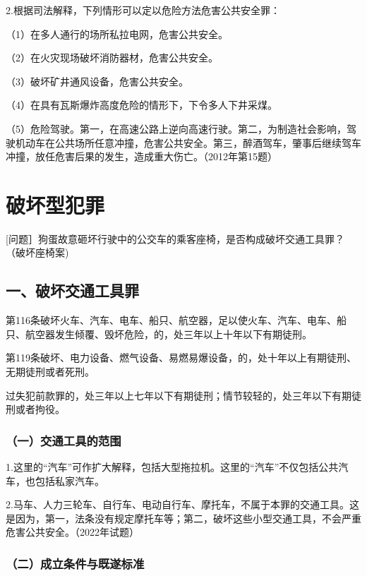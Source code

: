 2.根据司法解释，下列情形可以定以危险方法危害公共安全罪：

（1）在多人通行的场所私拉电网，危害公共安全。

（2）在火灾现场破坏消防器材，危害公共安全。

（3）破坏矿井通风设备，危害公共安全。

（4）在具有瓦斯爆炸高度危险的情形下，下令多人下井采煤。

（5）危险驾驶。第一，在高速公路上逆向高速行驶。第二，为制造社会影响，驾驶机动车在公共场所任意冲撞，危害公共安全。第三，醉酒驾车，肇事后继续驾车冲撞，放任危害后果的发生，造成重大伤亡。（2012年第15题）

\section{破坏型犯罪}

[问题］狗蛋故意砸坏行驶中的公交车的乘客座椅，是否构成破坏交通工具罪？（破坏座椅案)

\subsection*{一、破坏交通工具罪}

第116条破坏火车、汽车、电车、船只、航空器，足以使火车、汽车、电车、船只、航空器发生倾覆、毁坏危险，的，处三年以上十年以下有期徒刑。

第119条破坏、电力设备、燃气设备、易燃易爆设备，的，处十年以上有期徒刑、无期徒刑或者死刑。

过失犯前款罪的，处三年以上七年以下有期徒刑；情节较轻的，处三年以下有期徒刑或者拘役。

\subsubsection*{（一）交通工具的范围}

1.这里的“汽车”可作扩大解释，包括大型拖拉机。这里的“汽车”不仅包括公共汽车，也包括私家汽车。

2.马车、人力三轮车、自行车、电动自行车、摩托车，不属于本罪的交通工具。这是因为，第一，法条没有规定摩托车等；第二，破坏这些小型交通工具，不会严重危害公共安全。（2022年试题）

\subsubsection*{（二）成立条件与既遂标准}

